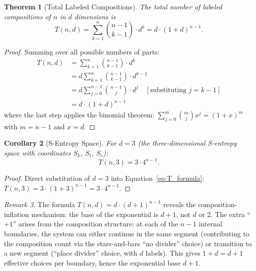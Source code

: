 \documentclass[twocolumn,10pt,a4paper]{article}
\newtheorem{theorem}{Theorem}[section]
\newtheorem{corollary}[theorem]{Corollary}
\theoremstyle{definition}
\theoremstyle{remark}
\newtheorem{remark}[theorem]{Remark}
\newcommand{\Sk}{S_k}
\newcommand{\St}{S_t}
\newcommand{\Se}{S_e}
\begin{document}
\begin{theorem}[Total Labeled Compositions]
\label{thm:total_labeled}
The total number of labeled compositions of $n$ in $d$ dimensions is
\begin{equation}
\label{eq:T_formula}
T(n,d) = \sum_{k=1}^{n} \binom{n-1}{k-1} \cdot d^k = d \cdot (1 + d)^{n-1}.
\end{equation}
\end{theorem}

\begin{proof}
Summing over all possible numbers of parts:
\begin{align}
T(n,d) &= \sum_{k=1}^{n} \binom{n-1}{k-1} \cdot d^k \nonumber \\
       &= d \sum_{k=1}^{n} \binom{n-1}{k-1} \cdot d^{k-1} \nonumber \\
       &= d \sum_{j=0}^{n-1} \binom{n-1}{j} \cdot d^{j} \quad [\text{substituting } j = k-1] \nonumber \\
       &= d \cdot (1 + d)^{n-1} \label{eq:binomial_step}
\end{align}
where the last step applies the binomial theorem: $\sum_{j=0}^{m} \binom{m}{j} x^j = (1+x)^m$ with $m = n-1$ and $x = d$.
\end{proof}

\begin{corollary}[S-Entropy Space]
\label{cor:d3}
For $d = 3$ (the three-dimensional S-entropy space with coordinates $\Sk$, $\St$, $\Se$):
\begin{equation}
T(n,3) = 3 \cdot 4^{n-1}.
\end{equation}
\end{corollary}

\begin{proof}
Direct substitution of $d = 3$ into Equation~\eqref{eq:T_formula}: $T(n,3) = 3 \cdot (1+3)^{n-1} = 3 \cdot 4^{n-1}$.
\end{proof}

\begin{remark}
The formula $T(n,d) = d \cdot (d+1)^{n-1}$ reveals the composition-inflation mechanism: the base of the exponential is $d+1$, not $d$ or $2$. The extra ``$+1$'' arises from the composition structure: at each of the $n-1$ internal boundaries, the system can either continue in the same segment (contributing to the composition count via the stars-and-bars ``no divider'' choice) or transition to a new segment (``place divider'' choice, with $d$ labels). This gives $1 + d = d+1$ effective choices per boundary, hence the exponential base $d+1$.
\end{remark}
\end{document}
